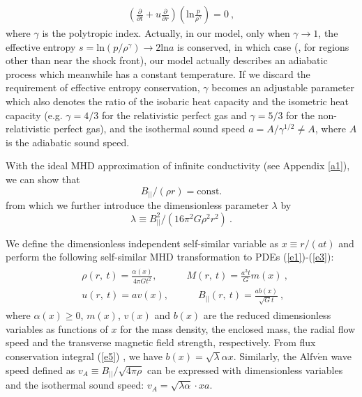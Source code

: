 \documentclass[fleqn,usenatbib]{mnras}
\begin{document}
\begin{gather}
\left(\frac{\partial}{\partial t}+u\frac{\partial}{\partial r}\right)\left(\mathrm{ln}\frac{p}{\rho^{\gamma}}\right)=0\ ,\label{ex1}
\end{gather}
where $\gamma$ is the polytropic index. Actually, in our model, only when $\gamma\rightarrow 1$, the effective entropy $s=\mathrm{ln}\left(p/\rho^{\gamma}\right)\rightarrow 2\mathrm{ln}a$ is conserved, in which case (, for regions other than near the shock front), our model actually describes an adiabatic process which meanwhile has a constant temperature. If we discard the requirement of effective entropy conservation, $\gamma$ becomes an adjustable parameter which also denotes the ratio of the isobaric heat capacity and the isometric heat capacity (e.g. $\gamma=4/3$ for the relativistic perfect gas and $\gamma=5/3$ for the non-relativistic perfect gas), and the isothermal sound speed $a=A/\gamma^{1/2}\neq A$, where $A$ is the adiabatic sound speed.

With the ideal MHD approximation of infinite conductivity (see Appendix \ref{a1}), we can show that \citep{yuLou2006} %
\begin{equation}
B_{||}/(\rho r)=\mathrm{const.}\label{e4}
\end{equation}
from which we further introduce the dimensionless
 parameter $\lambda$ by
\begin{equation}
\lambda\equiv B^{2}_{||}/
  \left(16\pi^{2}G\rho^{2} r^{2}\right)\ .\label{e5}
\end{equation}

We define the dimensionless independent self-similar variable as $x\equiv r/(at)$ and perform the following self-similar MHD transformation to PDEs (\ref{e1})-(\ref{e3}):
\begin{gather}
\begin{split}
&\rho(r,\ t)=\frac{\alpha(x)}{4\pi Gt^{2}},
 \qquad\quad M(r,\ t)=\frac{a^{3}t}{G}m(x)\ ,\\
&u(r,\ t)=av(x), \qquad\quad B_{||}(r,\ t)=\frac{ab(x)}{\sqrt{G}t}\ ,
\end{split}\label{e6}
\end{gather}
where $\alpha(x)\geq 0$, $m(x)$, $v(x)$ and $b(x)$ are the reduced dimensionless variables as functions of $x$ for the mass density, the enclosed mass, the radial flow speed and the transverse magnetic field strength, respectively. From flux conservation integral (\ref{e5}) , we have $b(x)=\sqrt{\lambda}\alpha x$. Similarly, the $\text{Alfv}\mathrm{\acute{e}}\text{n}$ wave speed defined as $v_{A}\equiv B_{||}/\sqrt{4\pi\rho}$ can be expressed with dimensionless variables and the isothermal sound speed: $v_{A}=\sqrt{\lambda\alpha}\cdot xa$.
\end{document}
